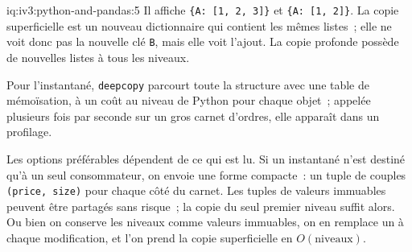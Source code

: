 \begin{solution}{iq:iv3:python-and-pandas:5}
Il affiche \texttt{\{\textquotesingle A\textquotesingle: [1, 2, 3]\}} et \texttt{\{\textquotesingle A\textquotesingle: [1, 2]\}}. La copie superficielle est un nouveau dictionnaire qui contient les mêmes listes~; elle ne voit donc pas la nouvelle clé \texttt{B}, mais elle voit l'ajout. La copie profonde possède de nouvelles listes à tous les niveaux.

Pour l'instantané, \texttt{deepcopy} parcourt toute la structure avec une table de mémoïsation, à un coût au niveau de Python pour chaque objet~; appelée plusieurs fois par seconde sur un gros carnet d'ordres, elle apparaît dans un profilage.

Les options préférables dépendent de ce qui est lu. Si un instantané n'est destiné qu'à un seul consommateur, on envoie une forme compacte~: un tuple de couples \texttt{(price, size)} pour chaque côté du carnet. Les tuples de valeurs immuables peuvent être partagés sans risque~; la copie du seul premier niveau suffit alors. Ou bien on conserve les niveaux comme valeurs immuables, on en remplace un à chaque modification, et l'on prend la copie superficielle en $O(\text{niveaux})$.

\end{solution}

